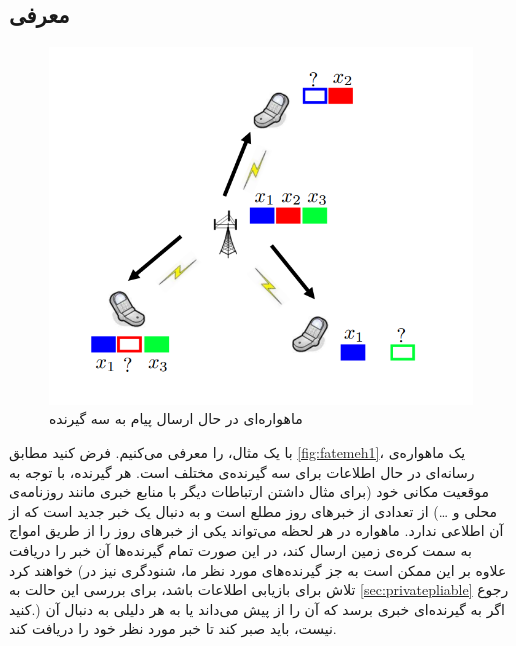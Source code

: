\subsection{
	معرفی \icod
	}
	\begin{figure}
		\centering
		\includegraphics[width=1\linewidth]{figs/chapter1/fatemeh1}
		\caption[
					ماهواره‌ای در حال ارسال پیام به سه گیرنده
		]{
			ماهواره‌ای در حال ارسال پیام به سه گیرنده
			\cite{fatemehbook}
		}
		\label{fig:fatemeh1}
	\end{figure}
با یک مثال، \icod را معرفی می‌کنیم. فرض کنید مطابق 
\autoref{fig:fatemeh1}،
یک ماهواره‌‌ی رسانه‌ای در حال 
 اطلاعات برای سه گیرنده‌ی مختلف است. 
هر گیرنده، با توجه به موقعیت مکانی خود (برای مثال داشتن ارتباطات دیگر با منابع خبری مانند روزنامه‌ی محلی و \ldots) از تعدادی از خبرهای روز مطلع است و به دنبال یک خبر جدید است که از آن اطلاعی ندارد. ماهواره در هر لحظه می‌تواند یکی از خبرهای روز را از طریق امواج به سمت کره‌ی زمین ارسال کند، در این صورت تمام گیرنده‌ها آن خبر را دریافت خواهند کرد (علاوه بر این ممکن است به جز گیرنده‌های مورد نظر ما، شنودگری نیز در تلاش برای بازیابی اطلاعات باشد، برای بررسی این حالت به
\autoref{sec:privatepliable} 
رجوع کنید.) اگر به گیرنده‌ای خبری برسد که آن را از پیش می‌داند یا به هر دلیلی به دنبال آن نیست، باید صبر کند تا خبر مورد نظر خود را دریافت کند. 

